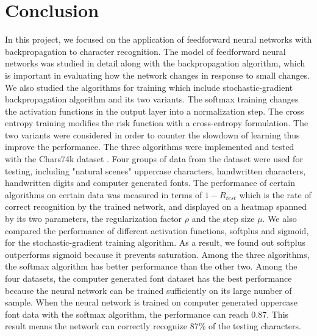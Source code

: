 \documentclass[journal,a4paper,onecolumn,11pt]{IEEEtran}
\begin{document}
\section{Conclusion}
In this project, we focused on the application of feedforward neural networks with backpropagation to character recognition. The model of feedforward neural networks was studied in detail along with the backpropagation algorithm, which is important in evaluating how the network changes in response to small changes. We also studied the algorithms for training which include stochastic-gradient backpropagation algorithm and its two variants. The softmax training changes the activation functions in the output layer into a normalization step. The cross entropy training modifies the risk function with a cross-entropy formulation. The two variants were considered in order to counter the slowdown of learning thus improve the performance. The three algorithms were implemented and tested with the Chars74k dataset \cite{bib:Chars74k}. Four groups of data from the dataset were used for testing, including "natural scenes" uppercase characters, handwritten characters, handwritten digits and computer generated fonts. The performance of certain algorithms on certain data was measured in terms of $1-R_{test}$ which is the rate of correct recognition by the trained network, and displayed on a heatmap spanned by its two parameters, the regularization factor $\rho$ and the step size $\mu$. We also compared the performance of different activation functions, softplus and sigmoid, for the stochastic-gradient training algorithm. As a result, we found out softplus outperforms sigmoid because it prevents saturation. Among the three algorithms, the softmax algorithm has better performance than the other two. Among the four datasets, the computer generated font dataset has the best performance because the neural network can be trained sufficiently on its large number of sample. When the neural network is trained on computer generated uppercase font data with the softmax algorithm, the performance can reach 0.87. This result means the network can correctly recognize 87\% of the testing characters.   
\end{document}
